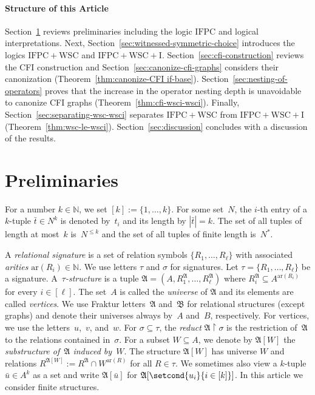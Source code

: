 \documentclass[]{lmcs}
\newcommand{\nat}{\mathbb{N}}
\newcommand{\defining}[1]{\emph{#1}}
\newcommand{\set}[1]{\lbrace #1 \rbrace}
\newcommand{\rel}{R}
\newcommand{\tup}[1]{\bar{#1}}
\newcommand{\Struct}{\mathfrak{A}}
\newcommand{\StructV}{A}
\newcommand{\vertA}{u}
\newcommand{\vertB}{v}
\newcommand{\vertC}{w}
\newcommand{\StructA}{\mathfrak{A}}
\newcommand{\StructB}{\mathfrak{B}}
\newcommand{\StructVA}{A}
\newcommand{\StructVB}{B}
\newcommand{\reduct}[2]{#1 \upharpoonright #2}
\newcommand{\arity}[1]{\mathrm{ar}(#1)}
\newcommand{\sig}{\tau}
\newcommand{\sigA}{\tau}
\newcommand{\sigB}{\sigma}
\newcommand{\IFPC}{\ensuremath{\mathrm{IFPC}}}
\newcommand{\IFPCWSC}{\ensuremath{\mathrm{IFPC{+}WSC}}}
\newcommand{\IFPCWSCI}{\ensuremath{\mathrm{IFPC{+}WSC{+}I}}}
\begin{document}
\paragraph{Structure of this Article}
Section~\ref{sec:prelimiaries} reviews preliminaries including the logic \IFPC{} and logical interpretations.
Next, Section~\ref{sec:witnessed-symmetric-choice} introduces
the logics \IFPCWSC{} and \IFPCWSCI{}.
Section~\ref{sec:cfi-construction} reviews the CFI construction
and Section~\ref{sec:canonize-cfi-graphs} considers their canonization (Theorem~\ref{thm:canonize-CFI if-base}).
Section~\ref{sec:nesting-of-operators} proves that the increase in the operator nesting depth is unavoidable to canonize CFI graphs (Theorem~\ref{thm:cfi-wsci-wsci}).
Finally, Section~\ref{sec:separating-wsc-wsci} separates \IFPCWSC{} from \IFPCWSCI{} (Theorem~\ref{thm:wsc-le-wsci}).
Section~\ref{sec:discussion} concludes with a discussion of the results.

\section{Preliminaries}
\label{sec:prelimiaries}

For a number $k\in \nat$, we set $[k] := \set{1,\dots, k}$.
For some set~$N$, the $i$-th entry of a $k$-tuple $\tup{t} \in  N^k$ is denoted by~$t_i$ and its length by $|\tup{t}|=k$.
The set of all tuples of length at most~$k$ is~$N^{\leq k}$
and the set of all tuples of finite length is~$N^*$.

A \defining{relational signature} is a set of relation symbols $\set{\rel_1,\dots, \rel_\ell}$ with associated \defining{arities} $\arity{\rel_i} \in \nat$. We use letters $\sigA$ and $\sigB$ for signatures.
Let $\sig = \set{\rel_1,\dots, \rel_\ell}$ be a signature.
A~\defining{$\sig$\nobreakdash-structure} is a tuple $\StructA = (\StructVA, \rel_1^\Struct, \dots, \rel_\ell^\Struct)$  where $\rel_i^\Struct \subseteq \StructVA^{\arity{\rel_i}}$ for every $i \in [\ell]$.
The set~$\StructVA$ is called the \defining{universe} of $\StructA$ and its elements are called \defining{vertices}.
We use Fraktur letters~$\StructA$ and~$\StructB$ for relational structures (except graphs)
and denote their universes always by~$\StructVA$ and~$\StructVB$, respectively.
For vertices, we use the letters~$\vertA$,~$\vertB$, and~$\vertC$.
For $\sigB \subseteq\sig$, the \defining{reduct} $\reduct{\StructA}{\sigB}$
is the restriction of~$\StructA$ to the relations contained in~$\sigB$.
For a subset $W \subseteq \StructVA$,
we denote by $\StructA[W]$ the \defining{substructure
of~$\StructA$ induced by~$W$}.
The structure $\StructA[W]$ has universe $W$
and relations $\rel^{\StructA[W]} := \rel^\StructA \cap W^{\arity{\rel}}$ for all $\rel \in \sig$.
We sometimes also view a $k$-tuple $\tup{\vertA} \in \StructV^k$ as a set
and write $\StructA[\tup{\vertA}]$ for $\StructA[\setcond{\vertA_i}{i \in [k]}]$.
In this article we consider finite structures.
\end{document}
